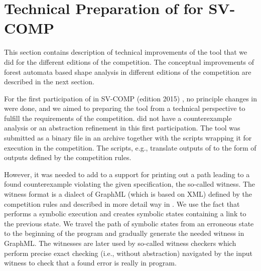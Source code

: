 {%


\section{Technical Preparation of \forester for SV-COMP}
This section contains description of technical improvements of the tool that we did
for the different editions of the  competition.
The conceptual improvements of forest automata based shape analysis in different
editions of the competition are described in the next section.

For the first participation of \forester in SV-COMP (edition 2015) \cite{svcomp15-forester},
no principle changes in \forester were done, and we aimed to preparing the tool from a technical
perspective to fulfill the requirements of the competition.
\forester did not have a counterexample analysis or an abstraction refinement in this first participation.
The tool was submitted as a binary file in an archive together
with the scripts wrapping it for execution in the competition.
The scripts, e.g., translate outputs of \forester to the form of outputs defined by the competition rules.

However, it was needed to add to \forester a support for printing out a path leading to
a found counterexample violating the given specification,
the so-called witness.
The witness format is a dialect of GraphML (which is based on XML) defined by the competition rules and described in more detail way in \cite{fse15-witness}.
We use the fact that \forester performs a symbolic execution and creates symbolic states containing a link to the previous state.
We travel the path of symbolic states from an erroneous state to the beginning of the program and gradually generate the needed witness in GraphML.
The witnesses are later used by so-called witness checkers which perform precise exact checking (i.e., without abstraction)
navigated by the input witness to check that a found error is really in program.

}

